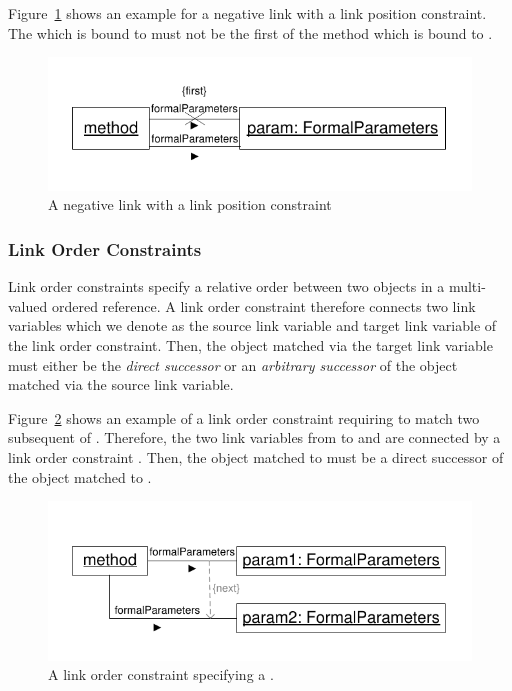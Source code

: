 {Figure~\ref{fig:linkPositionConstraintNegative} shows an example for a negative link with a link position constraint. The  which is bound to  must not be the first  of the method which is bound to .


\begin{figure}[htbp]
\center
\includegraphics[width=0.75\columnwidth]{figures/LinkPositionConstraintNegated}
\caption{A negative link with a  link position constraint}
\label{fig:linkPositionConstraintNegative}
\end{figure}



\subsubsection{Link Order Constraints}
\label{sec:StoryPatterns:linkConstraints:orderConstraint}

Link order constraints specify a relative order between two objects in a multi-valued ordered reference. A link order constraint therefore connects two link variables which we denote as the source link variable and target link variable of the link order constraint. Then, the object matched via the target link variable must either be the \emph{direct successor} or an  \emph{arbitrary successor} of the object matched via the source link variable.

Figure~\ref{fig:linkOrderConstraintDirectSuccessor} shows an example of a link order constraint requiring to match two subsequent  of . Therefore, the two link variables from  to  and  are connected by a link order constraint . Then, the object matched to  must be a direct successor of the object matched to .

\begin{figure}[htbp]
\center
\includegraphics[width=0.75\columnwidth]{figures/LinkOrderConstraintDirectSuccessor}
\caption{A link order constraint specifying a .}
\label{fig:linkOrderConstraintDirectSuccessor}
\end{figure}

}

